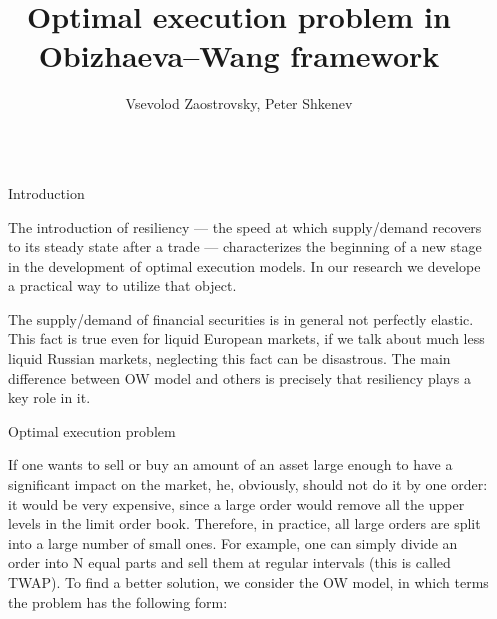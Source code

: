 \documentclass[]{beamer}
\title{Optimal execution problem in Obizhaeva--Wang framework}
\author{Vsevolod Zaostrovsky, Peter Shkenev}
\begin{document}
\nocite{*} %

\begin{frame}[t]
    \begin{columns}[t] %
     
    \begin{column}{\lrmargin}\end{column} %
    
    \begin{column}{\onecolwid} %
     
    
    \begin{block}{Introduction}
    
        The introduction of resiliency --- the speed at which supply/demand recovers to its steady state after 
        a trade --- characterizes the beginning of a new stage in the development of optimal execution models.
        In our research we develope a practical way to utilize that object. \par
        The supply/demand of ﬁnancial securities is in general not perfectly elastic. This fact is true even for liquid European markets, if we talk about 
        much less liquid Russian markets, neglecting this fact can be disastrous. The main difference between OW model and others is precisely 
        that resiliency plays a key role in it.
        
    
    \end{block}

    \begin{block}{Optimal execution problem}
    
        If one wants to sell or buy an amount of an asset large enough to have a significant 
        impact on the market, he, obviously, should not do it by one order: it would be very expensive, since a large order 
        would remove all the upper levels in the limit order book. Therefore, in practice, all large orders are split into a large number of small ones. 
        For example, one can simply divide an order into N equal parts and sell them at regular intervals (this is called TWAP). 
        To find a better solution, we consider the OW model, in which terms the problem has the following form: \par  



\end{block}
\end{column}
\end{columns}
\end{frame}
\end{document}
